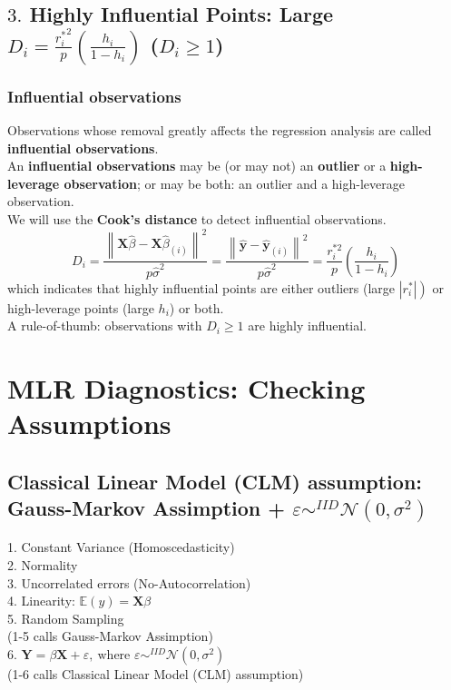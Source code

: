 \documentclass[11pt,a4paper]{article}
\begin{document}
\subsection{ $3.$ Highly Inﬂuential Points: Large $D_i=\frac{{r_i^*}^2}{p}(\frac{h_i}{1-h_i})$ \quad ($D_i\geq 1$)}
\subsubsection{Inﬂuential observations}
Observations whose removal greatly aﬀects the regression analysis are called \textbf{inﬂuential observations}.\\
An \textbf{inﬂuential observations} may be (or may not) an \textbf{outlier} or a \textbf{high-leverage observation}; or may be both: an outlier and a high-leverage observation.\\
We will use the \textbf{Cook's distance} to detect influential observations.
$$
D_{i}=\frac{\left\|\mathbf{X} \hat{\beta}-\mathbf{X} \hat{\beta}_{(i)}\right\|^{2}}{p \hat{\sigma}^{2}}=\frac{\left\|\hat{\mathbf{y}}-\hat{\mathbf{y}}_{(i)}\right\|^{2}}{p \hat{\sigma}^{2}}=\frac{r_{i}^{* 2}}{p}\left(\frac{h_{i}}{1-h_{i}}\right)
$$
which indicates that highly influential points are either outliers (large $\left.\left|r_{i}^{*}\right|\right)$ or high-leverage points (large $h_{i}$) or both.\\
A rule-of-thumb: observations with $D_{i} \geq 1$ are highly influential.

\section{ MLR Diagnostics: Checking Assumptions}
\subsection{Classical Linear Model (CLM) assumption: Gauss-Markov Assimption + $\varepsilon \sim^{IID} \mathcal{N}(0,\sigma^2)$}
1. Constant Variance (Homoscedasticity)\\
2. Normality\\
3. Uncorrelated errors (No-Autocorrelation)\\
4. Linearity: $\mathbb{E}(y)=\mathbf{X}\beta$\\
5. Random Sampling\\
(1-5 calls Gauss-Markov Assimption)\\
6. $\mathbf{Y}=\beta \mathbf{X}+\varepsilon,\ \text{where }\varepsilon\sim^{IID} \mathcal{N}(0,\sigma^2)$\\
(1-6 calls Classical Linear Model (CLM) assumption)
\end{document}
